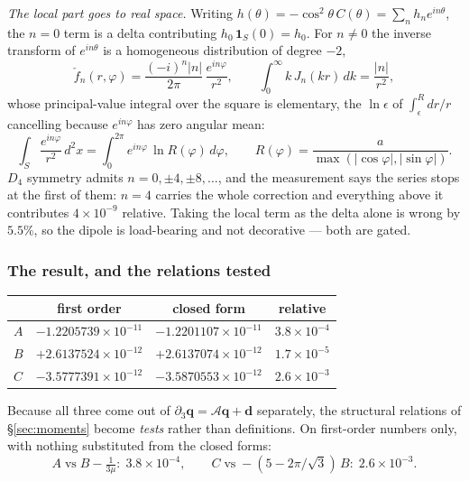 \documentclass[11pt,a4paper]{article}
\newcommand{\bq}{\mathbf{q}}
\newcommand{\bd}{\mathbf{d}}
\newcommand{\Aop}{\mathcal{A}}
\begin{document}
\emph{The local part goes to real space.}  Writing
$h(\theta) = -\cos^2\!\theta\,C(\theta) = \sum_n h_n e^{in\theta}$, the $n=0$
term is a delta contributing $h_0\,\mathbf{1}_S(0) = h_0$.  For $n\neq0$ the
inverse transform of $e^{in\theta}$ is a homogeneous distribution of degree
$-2$,
\begin{equation}\label{eq:pvdipole}
  \check{f}_n(r,\varphi) = \frac{(-i)^n |n|}{2\pi}\,\frac{e^{in\varphi}}{r^{2}},
  \qquad \int_0^\infty\! k\,J_n(kr)\,dk = \frac{|n|}{r^{2}},
\end{equation}
whose principal-value integral over the square is elementary, the $\ln\epsilon$
of $\int_\epsilon^R dr/r$ cancelling because $e^{in\varphi}$ has zero angular
mean:
\begin{equation}\label{eq:pvsquare}
  \int_S \frac{e^{in\varphi}}{r^{2}}\,d^2x
  = \int_0^{2\pi}\! e^{in\varphi}\,\ln R(\varphi)\,d\varphi,
  \qquad R(\varphi) = \frac{a}{\max(|\cos\varphi|,|\sin\varphi|)} .
\end{equation}
$D_4$ symmetry admits $n = 0, \pm4, \pm8,\dots$, and the measurement says the
series stops at the first of them: $n=4$ carries the whole correction and
everything above it contributes $4\times10^{-9}$ relative.  Taking the local
term as the delta alone is wrong by $5.5\%$, so the dipole is load-bearing and
not decorative --- both are gated.

\subsubsection*{The result, and the relations tested}

\begin{center}
\begin{tabular}{lccc}
\toprule
 & first order & closed form & relative\\
\midrule
$A$ & $-1.2205739\times10^{-11}$ & $-1.2201107\times10^{-11}$ & $3.8\times10^{-4}$\\
$B$ & $+2.6137524\times10^{-12}$ & $+2.6137074\times10^{-12}$ & $1.7\times10^{-5}$\\
$C$ & $-3.5777391\times10^{-12}$ & $-3.5870553\times10^{-12}$ & $2.6\times10^{-3}$\\
\bottomrule
\end{tabular}
\end{center}

Because all three come out of $\partial_3\bq = \Aop\bq+\bd$ separately, the
structural relations of \S\ref{sec:moments} become \emph{tests} rather than
definitions.  On first-order numbers only, with nothing substituted from the
closed forms:
\begin{equation}\label{eq:relstested}
  A \;\text{vs}\; B - \tfrac{1}{3\mu}: \; 3.8\times10^{-4},
  \qquad
  C \;\text{vs}\; -(5-2\pi/\!\sqrt3)\,B: \; 2.6\times10^{-3}.
\end{equation}
\end{document}
